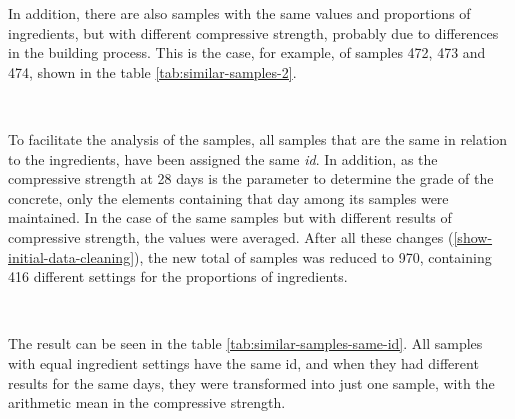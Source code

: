 \documentclass[
]{article}
\begin{document}
In addition, there are also samples with the same values and proportions
of ingredients, but with different compressive strength, probably due to
differences in the building process. This is the case, for example, of
samples 472, 473 and 474, shown in the table
\ref{tab:similar-samples-2}.

~

\begin{table}

\caption{\label{tab:similar-samples-2}Same samples with different results}
\centering
{}
\end{table}

To facilitate the analysis of the samples, all samples that are the same
in relation to the ingredients, have been assigned the same \emph{id}.
In addition, as the compressive strength at 28 days is the parameter to
determine the grade of the concrete, only the elements containing that
day among its samples were maintained. In the case of the same samples
but with different results of compressive strength, the values were
averaged. After all these changes (\ref{show-initial-data-cleaning}),
the new total of samples was reduced to 970, containing 416 different
settings for the proportions of ingredients.

~

The result can be seen in the table \ref{tab:similar-samples-same-id}.
All samples with equal ingredient settings have the same id, and when
they had different results for the same days, they were transformed into
just one sample, with the arithmetic mean in the compressive strength.
\end{document}
